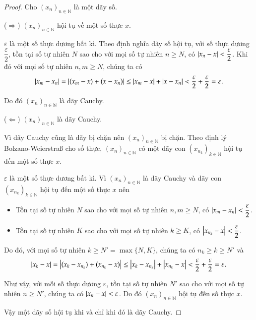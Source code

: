\begin{proof}
    Cho ${(x_{n})}_{n\in\mathbb{N}}$ là một dãy số.

    ($\Rightarrow$) ${(x_{n})}_{n\in\mathbb{N}}$ hội tụ về một số thực $x$.

    $\varepsilon$ là một số thực dương bất kì. Theo định nghĩa dãy số hội tụ, với số thực dương $\dfrac{\varepsilon}{2}$, tồn tại số tự nhiên $N$ sao cho với mọi số tự nhiên $n\geq N$, có $\left\vert{x_{n} - x}\right\vert < \dfrac{\varepsilon}{2}$. Khi đó với mọi số tự nhiên $n, m\geq N$, chúng ta có
    \[
        \left\vert{x_{m} - x_{n}}\right\vert = \left\vert{(x_{m} - x) + (x - x_{n})}\right\vert\leq \left\vert{x_{m} - x}\right\vert + \left\vert{x - x_{n}}\right\vert < \frac{\varepsilon}{2} + \frac{\varepsilon}{2} = \varepsilon.
    \]

    Do đó ${(x_{n})}_{n\in\mathbb{N}}$ là dãy Cauchy.

    ($\Leftarrow$) ${(x_{n})}_{n\in\mathbb{N}}$ là dãy Cauchy.

    Vì dãy Cauchy cũng là dãy bị chặn nên ${(x_{n})}_{n\in\mathbb{N}}$ bị chặn. Theo định lý Bolzano-Weierstra{\ss} cho số thực, ${(x_{n})}_{n\in\mathbb{N}}$ có một dãy con ${(x_{n_{k}})}_{k\in\mathbb{N}}$ hội tụ đến một số thực $x$.

    $\varepsilon$ là một số thực dương bất kì. Vì ${(x_{n})}_{n\in\mathbb{N}}$ là dãy Cauchy và dãy con ${(x_{n_{k}})}_{k\in\mathbb{N}}$ hội tụ đến một số thực $x$ nên
    \begin{itemize}
        \item Tồn tại số tự nhiên $N$ sao cho với mọi số tự nhiên $n, m\geq N$, có $\left\vert{x_{m} - x_{n}}\right\vert < \dfrac{\varepsilon}{2}$.
        \item Tồn tại số tự nhiên $K$ sao cho với mọi số tự nhiên $k\geq K$, có $\left\vert{x_{n_{k}} - x}\right\vert < \dfrac{\varepsilon}{2}$.
    \end{itemize}

    Do đó, với mọi số tự nhiên $k\geq N' = \max\{ N, K \}$, chúng ta có $n_{k}\geq k\geq N'$ và
    \[
        \left\vert{x_{k} - x}\right\vert = \left\vert{(x_{k} - x_{n_{k}}) + (x_{n_{k}} - x)}\right\vert \leq \left\vert{x_{k} - x_{n_{k}}}\right\vert + \left\vert{x_{n_{k}} - x}\right\vert < \frac{\varepsilon}{2} + \frac{\varepsilon}{2} = \varepsilon.
    \]

    Như vậy, với mỗi số thực dương $\varepsilon$, tồn tại số tự nhiên $N'$ sao cho với mọi số tự nhiên $n\geq N'$, chúng ta có $\left\vert{x_{n} - x}\right\vert < \varepsilon$. Do đó ${(x_{n})}_{n\in\mathbb{N}}$ hội tụ đến số thực $x$.

    Vậy một dãy số hội tụ khi và chỉ khi đó là dãy Cauchy.
\end{proof}
